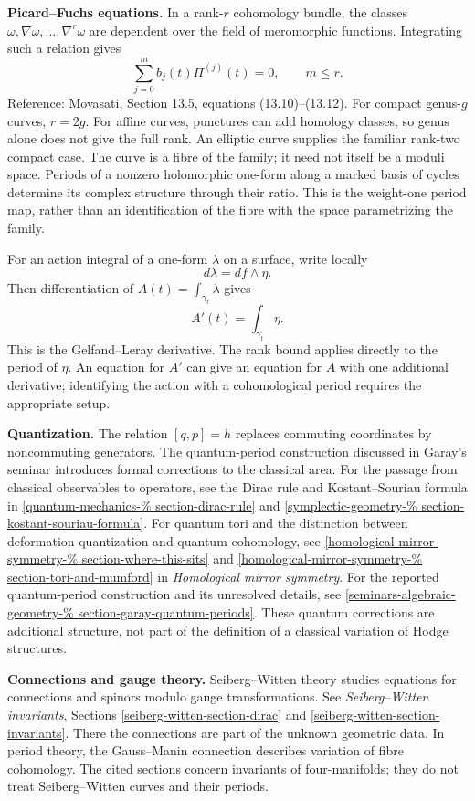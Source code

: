 \medskip\noindent
{\bf Picard--Fuchs equations.}
In a rank-$r$ cohomology bundle, the
classes $\omega,\nabla\omega,\ldots,
\nabla^r\omega$ are dependent over the
field of meromorphic functions.
Integrating such a relation gives
$$
\sum_{j=0}^{m}b_j(t)\Pi^{(j)}(t)=0,
\qquad m\leq r.
$$
Reference: Movasati, Section 13.5,
equations (13.10)--(13.12).
For compact genus-$g$ curves, $r=2g$.
For affine curves, punctures can add
homology classes, so genus alone does
not give the full rank.
An elliptic curve supplies the familiar
rank-two compact case. The curve is a
fibre of the family; it need not itself
be a moduli space. Periods of a nonzero
holomorphic one-form along a marked
basis of cycles determine its complex
structure through their ratio. This is
the weight-one period map, rather than
an identification of the fibre with the
space parametrizing the family.

For an action integral of a one-form
$\lambda$ on a surface, write locally
$$
d\lambda=df\wedge\eta.
$$
Then differentiation of
$A(t)=\int_{\gamma_t}\lambda$ gives
$$
A'(t)=\int_{\gamma_t}\eta.
$$
This is the Gelfand--Leray derivative.
The rank bound applies directly to the
period of $\eta$. An equation for $A'$
can give an equation for $A$ with one
additional derivative; identifying the
action with a cohomological period
requires the appropriate setup.

\medskip\noindent
{\bf Quantization.}
The relation $[q,p]=h$ replaces commuting
coordinates by noncommuting generators.
The quantum-period construction discussed
in Garay's seminar introduces formal
corrections to the classical area.
For the passage from classical observables
to operators,
see the Dirac rule and Kostant--Souriau
formula in
\ref{quantum-mechanics-%
section-dirac-rule} and
\ref{symplectic-geometry-%
section-kostant-souriau-formula}.
For quantum tori and the distinction
between deformation quantization and
quantum cohomology, see
\ref{homological-mirror-symmetry-%
section-where-this-sits} and
\ref{homological-mirror-symmetry-%
section-tori-and-mumford}
in {\it Homological mirror symmetry}.
For the reported quantum-period
construction and its unresolved details,
see \ref{seminars-algebraic-geometry-%
section-garay-quantum-periods}.
These quantum corrections are additional
structure, not part of the definition of
a classical variation of Hodge structures.

\medskip\noindent
{\bf Connections and gauge theory.}
Seiberg--Witten theory studies equations
for connections and spinors modulo gauge
transformations. See
{\it Seiberg--Witten invariants}, Sections
\ref{seiberg-witten-section-dirac} and
\ref{seiberg-witten-section-invariants}.
There the connections are part of the
unknown geometric data. In period theory,
the Gauss--Manin connection describes
variation of fibre cohomology.
The cited sections concern invariants of
four-manifolds; they do not treat
Seiberg--Witten curves and their periods.

